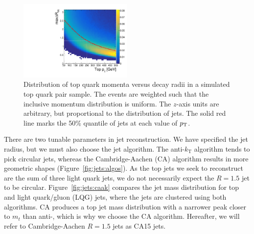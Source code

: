 \begin{figure}[]
    \begin{center}
        \includegraphics[width=0.5\textwidth]{figures/toptagging/gen/ptdr.pdf}
        \caption{Distribution of top quark momenta versus decay radii in a simulated top quark pair sample.
                 The events are weighted such that the inclusive momentum distribution is uniform. 
                 The $z$-axis units are arbitrary, but proportional to the distribution of jets. 
                 The solid red line marks the 50\% quantile of jets at each value of $p_\mathrm{T}$. }
        \label{fig:jets:dr}
    \end{center}
\end{figure}

There are two tunable parameters in jet reconstruction.
We have specified the jet radius, but we must also choose the jet algorithm.
The anti-$k_\mathrm{T}$ algorithm tends to pick circular jets, whereas the Cambridge-Aachen (CA) algorithm results in more geometric shapes (Figure~\ref{fig:jets:algos}).
As the top jets we seek to reconstruct are the sum of three light quark jets, we do not necessarily expect the $R=1.5$ jet to be circular.
Figure~\ref{fig:jets:caak} compares the jet mass distribution for top and light quark/gluon (LQG) jets, where the jets are clustered using both algorithms.
CA produces a top jet mass distribution with a narrower peak closer to $m_t$ than anti-\kt, which is why we choose the CA algorithm. 
Hereafter, we will refer to Cambridge-Aachen $R=1.5$ jets as CA15 jets. 

